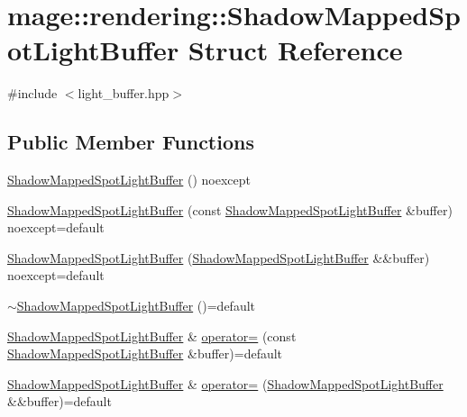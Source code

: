 \hypertarget{structmage_1_1rendering_1_1_shadow_mapped_spot_light_buffer}{}\section{mage\+:\+:rendering\+:\+:Shadow\+Mapped\+Spot\+Light\+Buffer Struct Reference}
\label{structmage_1_1rendering_1_1_shadow_mapped_spot_light_buffer}


{\ttfamily \#include $<$light\+\_\+buffer.\+hpp$>$}

\subsection*{Public Member Functions}
\begin{DoxyCompactItemize}
\item 
\hyperlink{structmage_1_1rendering_1_1_shadow_mapped_spot_light_buffer_a88d393bc59e25f35d29e478de8c81c89}{Shadow\+Mapped\+Spot\+Light\+Buffer} () noexcept
\item 
\hyperlink{structmage_1_1rendering_1_1_shadow_mapped_spot_light_buffer_ac984180fa57278b851bbaf3b081a4343}{Shadow\+Mapped\+Spot\+Light\+Buffer} (const \hyperlink{structmage_1_1rendering_1_1_shadow_mapped_spot_light_buffer}{Shadow\+Mapped\+Spot\+Light\+Buffer} \&buffer) noexcept=default
\item 
\hyperlink{structmage_1_1rendering_1_1_shadow_mapped_spot_light_buffer_a9042ab916ee834f5519b5930de286ea4}{Shadow\+Mapped\+Spot\+Light\+Buffer} (\hyperlink{structmage_1_1rendering_1_1_shadow_mapped_spot_light_buffer}{Shadow\+Mapped\+Spot\+Light\+Buffer} \&\&buffer) noexcept=default
\item 
\hyperlink{structmage_1_1rendering_1_1_shadow_mapped_spot_light_buffer_ae651274fb4d113e173b62cb18191f1b9}{$\sim$\+Shadow\+Mapped\+Spot\+Light\+Buffer} ()=default
\item 
\hyperlink{structmage_1_1rendering_1_1_shadow_mapped_spot_light_buffer}{Shadow\+Mapped\+Spot\+Light\+Buffer} \& \hyperlink{structmage_1_1rendering_1_1_shadow_mapped_spot_light_buffer_a2c209b2648740696d45113a152e648fb}{operator=} (const \hyperlink{structmage_1_1rendering_1_1_shadow_mapped_spot_light_buffer}{Shadow\+Mapped\+Spot\+Light\+Buffer} \&buffer)=default
\item 
\hyperlink{structmage_1_1rendering_1_1_shadow_mapped_spot_light_buffer}{Shadow\+Mapped\+Spot\+Light\+Buffer} \& \hyperlink{structmage_1_1rendering_1_1_shadow_mapped_spot_light_buffer_ae2687b41af138b43fc814883310a877b}{operator=} (\hyperlink{structmage_1_1rendering_1_1_shadow_mapped_spot_light_buffer}{Shadow\+Mapped\+Spot\+Light\+Buffer} \&\&buffer)=default
\end{DoxyCompactItemize}
